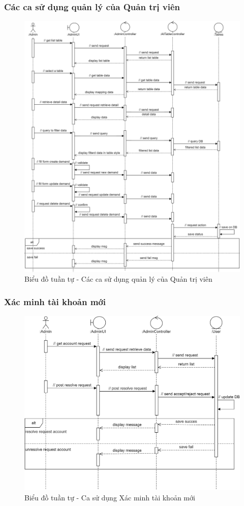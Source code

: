 \documentclass[./../main.tex]{subfiles}
\begin{document}
\subsubsection{Các ca sử dụng quản lý của Quản trị viên}
\begin{figure}[H]
	\centering
	\includegraphics[width=\linewidth]{./img/uc16-19.png}
	\caption{Biểu đồ tuần tự - Các ca sử dụng quản lý của Quản trị viên}
\end{figure}

\subsubsection{Xác minh tài khoản mới}
\begin{figure}[H]
	\centering
	\includegraphics[width=\linewidth]{./img/uc20.png}
	\caption{Biểu đồ tuần tự - Ca sử dụng Xác minh tài khoản mới}
\end{figure}
\end{document}
